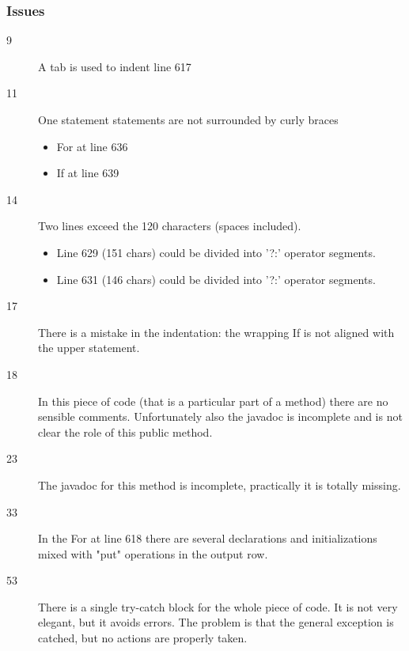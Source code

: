 		\subsubsection{Issues}
		\begin{description}
			\item[9] A tab is used to indent line 617
			\item[11] One statement statements are not surrounded by curly braces
			\begin{itemize}
				\item For at line 636
				\item If at line 639
			\end{itemize}
			\item[14] Two lines exceed the 120 characters (spaces included).
			\begin{itemize}
				\item Line 629 (151 chars) could be divided into '?:' operator segments.
				\item Line 631 (146 chars) could be divided into '?:' operator segments.
			\end{itemize}
			\item[17] There is a mistake in the indentation: the wrapping If is not aligned with the upper statement.
			\item[18] In this piece of code (that is a particular part of a method) there are no sensible comments.
			Unfortunately also the javadoc is incomplete and is not clear the role of this public method.
			\item[23] The javadoc for this method is incomplete, practically it is totally missing.
			\item[33] In the For at line 618 there are several declarations and initializations mixed with "put"
			operations in the output row.
			\item[53] There is a single try-catch block for the whole piece of code. It is not very elegant, but
			it avoids errors. The problem is that the general exception is catched, but no actions are properly taken.
		\end{description}